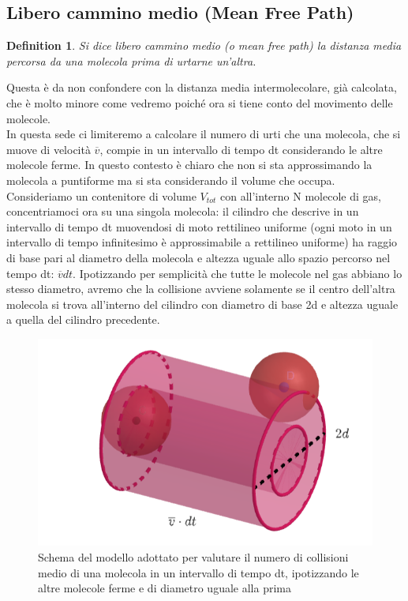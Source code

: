 \documentclass[10pt,a4paper]{article}
\newtheorem{definition}{Definition}
\begin{document}
\subsection{Libero cammino medio (Mean Free Path)}
\begin{definition}
Si dice libero cammino medio (o mean free path) la distanza media percorsa da una molecola prima di urtarne un’altra. 
\end{definition}
Questa è da non confondere con la distanza media intermolecolare, già calcolata, che è molto minore come vedremo poiché ora si tiene conto del movimento delle molecole.\\
In questa sede ci limiteremo a calcolare il numero di urti che una molecola, che si muove di velocità $\overline{v}$, compie in un intervallo di tempo dt considerando le altre molecole ferme. In questo contesto è chiaro che non si sta approssimando la molecola a puntiforme ma si sta considerando il volume che occupa. Consideriamo un contenitore di volume $V_{tot}$ con all'interno N molecole di gas, concentriamoci ora su una singola molecola: il cilindro che descrive in un intervallo di tempo dt muovendosi di moto rettilineo uniforme (ogni moto in un intervallo di tempo infinitesimo è approssimabile a rettilineo uniforme) ha raggio di base pari al diametro della molecola e altezza uguale allo spazio percorso nel tempo dt: $\overline{v}dt$. Ipotizzando per semplicità che tutte le molecole nel gas abbiano lo stesso diametro, avremo che la collisione avviene solamente se il centro dell'altra molecola si trova all'interno del cilindro con diametro di base 2d e altezza uguale a quella del cilindro precedente.  
\begin{figure}[h!]
	\centering
	\includegraphics[width=0.7\linewidth]{libero_cammino_medio}
	\caption{Schema del modello adottato per valutare il numero di collisioni medio di una molecola in un intervallo di tempo dt, ipotizzando le altre molecole ferme e di diametro uguale alla prima}
	\label{fig:liberocamminomedio}
\end{figure}
\end{document}
